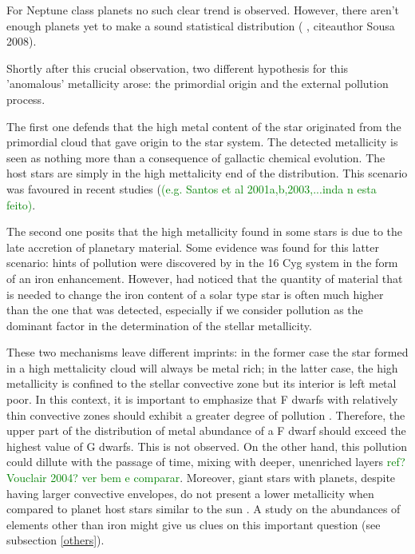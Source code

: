 \documentclass[dvips,12pt,a4paper]{report}
\begin{document}
For Neptune class planets no such clear trend is observed. However, there aren't enough planets yet to make a sound statistical distribution (\citeauthor{Udry-2006} \citeyear{Udry-2006}, citeauthor Sousa 2008).

Shortly after this crucial observation, two different hypothesis for this 'anomalous' metallicity arose: the primordial origin and the external pollution process. 

The first one defends that the high metal content of the star originated from the primordial cloud that gave origin to the star system. The detected metallicity is seen as nothing more than a consequence of gallactic chemical evolution. The host stars are simply in the high mettalicity end of the distribution. This scenario was favoured in recent studies (\textcolor{green}{(e.g. Santos et al 2001a,b,2003,...inda n esta feito)}. 

The second one posits that the high metallicity found in some stars is due to the late accretion of planetary material. Some evidence was found for this latter scenario: hints of pollution were discovered by \citet{Gonzalez-1998} in the 16 Cyg system  in the form of an iron enhancement. However, \citet{Santos-2001b} had noticed that the quantity of material that is needed to change the iron content of a solar type star is often much higher than the one that was detected, especially if we consider pollution as the dominant factor in the determination of the stellar metallicity. 

These two mechanisms leave different imprints: in the former case the star formed in a high mettalicity cloud will always be metal rich; in the latter case, the high metallicity is confined to the stellar convective zone but its interior is left metal poor. In this context, it is important to emphasize that F dwarfs with relatively thin convective zones should exhibit a greater degree of pollution \citep{Fischer-2005}. Therefore, the upper part of the distribution of metal abundance of a F dwarf should exceed the highest value of G dwarfs. This is not observed. On the other hand, this pollution could dillute with the passage of time, mixing with deeper, unenriched layers \textcolor{green}{ref? Vouclair 2004? ver bem e comparar}. Moreover, giant stars with planets, despite having larger convective envelopes, do not present a lower metallicity when compared to planet host stars similar to the sun \citep{Ecuvillon-2006b}. A study on the abundances of elements other than iron might give us clues on this important question (see subsection \ref{others}).
\end{document}
